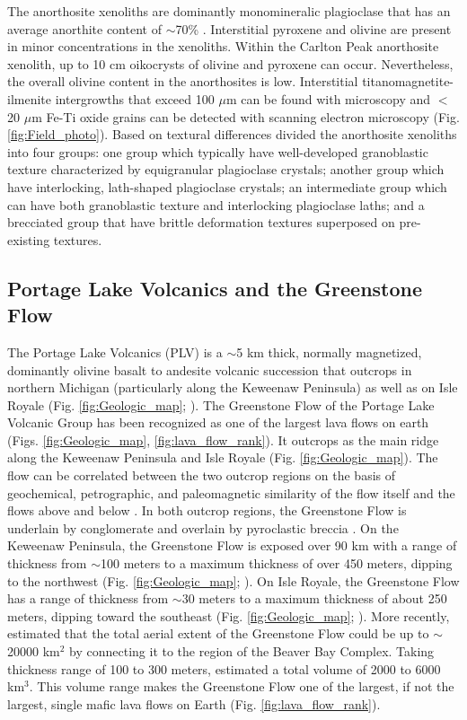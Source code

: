 The anorthosite xenoliths are dominantly monomineralic plagioclase that has an average anorthite content of $\sim$70\% \cite{Morrison1983a, Doyle2016a}. Interstitial pyroxene and olivine are present in minor concentrations in the xenoliths. Within the Carlton Peak anorthosite xenolith, up to 10 cm oikocrysts of olivine and pyroxene can occur. Nevertheless, the overall olivine content in the anorthosites is low. Interstitial titanomagnetite-ilmenite intergrowths that exceed 100 $\mu$m can be found with microscopy and $<$20 $\mu$m Fe-Ti oxide grains can be detected with scanning electron microscopy (Fig. \ref{fig:Field_photo}). Based on textural differences  divided the anorthosite xenoliths into four groups: one group which typically have well-developed granoblastic texture characterized by equigranular plagioclase crystals; another group which have interlocking, lath-shaped plagioclase crystals; an intermediate group which can have both granoblastic texture and interlocking plagioclase laths; and a brecciated group that have brittle deformation textures superposed on pre-existing textures. 

\subsection{Portage Lake Volcanics and the Greenstone Flow}

The Portage Lake Volcanics (PLV) is a $\sim$5 km thick, normally magnetized, dominantly olivine basalt to andesite volcanic succession that outcrops in northern Michigan (particularly along the Keweenaw Peninsula) as well as on Isle Royale (Fig. \ref{fig:Geologic_map}; ). The Greenstone Flow of the Portage Lake Volcanic Group has been recognized as one of the largest lava flows on earth (Figs. \ref{fig:Geologic_map}, \ref{fig:lava_flow_rank}). It outcrops as the main ridge along the Keweenaw Peninsula and Isle Royale (Fig. \ref{fig:Geologic_map}). The flow can be correlated between the two outcrop regions on the basis of geochemical, petrographic, and paleomagnetic similarity of the flow itself and the flows above and below \cite{Longo1984a}. In both outcrop regions, the Greenstone Flow is underlain by conglomerate and overlain by pyroclastic breccia \cite{Lane1911a, Huber1973a}. On the Keweenaw Peninsula, the Greenstone Flow is exposed over 90 km with a range of thickness from $\sim$100 meters to a maximum thickness of over 450 meters, dipping to the northwest (Fig. \ref{fig:Geologic_map}; ). On Isle Royale, the Greenstone Flow has a range of thickness from $\sim$30 meters to a maximum thickness of about 250 meters, dipping toward the southeast (Fig. \ref{fig:Geologic_map}; ). More recently,  estimated that the total aerial extent of the Greenstone Flow could be up to $\sim$20000 km$^2$ by connecting it to the region of the Beaver Bay Complex. Taking thickness range of 100 to 300 meters,  estimated a total volume of 2000 to 6000 km$^3$. This volume range makes the Greenstone Flow one of the largest, if not the largest, single mafic lava ﬂows on Earth (Fig. \ref{fig:lava_flow_rank}).

